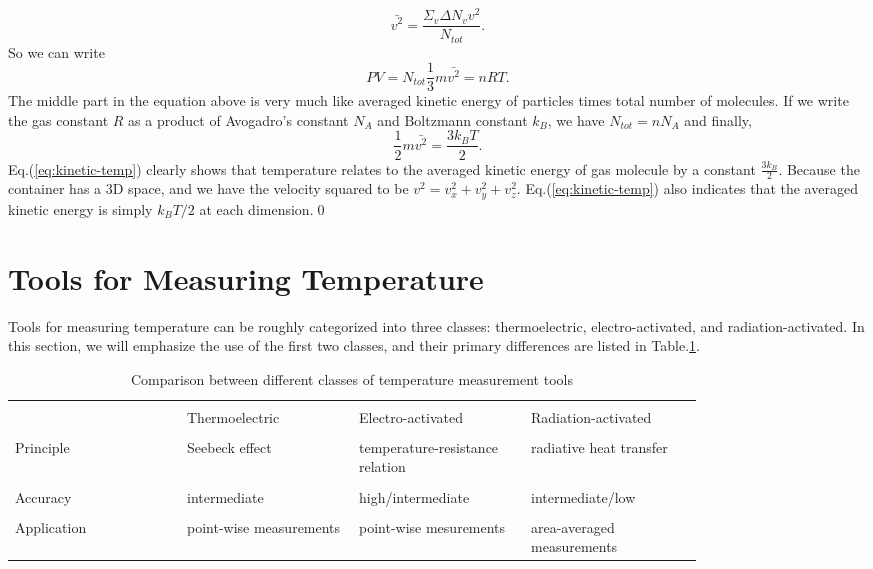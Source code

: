 \begin{equation}
	\bar{v^2}=\frac{\Sigma_v\Delta N_vv^2}{N_{tot}}.
\end{equation}
So we can write
\begin{equation}
	PV = N_{tot}\dfrac{1}{3}m\bar{v^2} = nRT.
\end{equation}
The middle part in the equation above is very much like averaged kinetic energy of particles times total number of molecules. If we write the gas constant $ R $ as a product of Avogadro's constant $ N_A $ and Boltzmann constant $ k_B $, we have $ N_{tot}=nN_A $ and finally,
\begin{equation}
	\frac{1}{2}m\bar{v^2}=\frac{3k_BT}{2}.
	\label{eq:kinetic-temp}
\end{equation}
Eq.(\ref{eq:kinetic-temp}) clearly shows that temperature relates to the averaged kinetic energy of gas molecule by a constant $ \frac{3k_B}{2} $. Because the container has a 3D space, and we have the velocity squared to be $ v^2=v_x^2+v_y^2+v_z^2 $. Eq.(\ref{eq:kinetic-temp}) also indicates that the averaged kinetic energy is simply $ k_BT/2 $ at each dimension.\qed

\section{Tools for Measuring Temperature}
Tools for measuring temperature can be roughly categorized into three classes: thermoelectric, electro-activated, and radiation-activated. In this section, we will emphasize the use of the first two classes, and their primary differences are listed in Table.\ref{tab:toolclass}.
\begin{table}[h]
	\footnotesize
	\begin{tabular}{m{0.2\linewidth}|m{0.2\linewidth}m{0.2\linewidth}m{0.2\linewidth}}
		\hline\\[-0.6em]
		& Thermoelectric          & Electro-activated               & Radiation-activated        \\ \hline\\[-0.6em]
		Principle   & Seebeck effect          & temperature-resistance relation & radiative heat transfer    \\ \hline \\[-0.6em]
		Accuracy    & intermediate            & high/intermediate               & intermediate/low           \\ \hline \\[-0.6em]
		Application & point-wise measurements & point-wise mesurements          & area-averaged measurements \\ \hline
	\end{tabular}
\caption{Comparison between different classes of temperature measurement tools}
\label{tab:toolclass}
\end{table}

